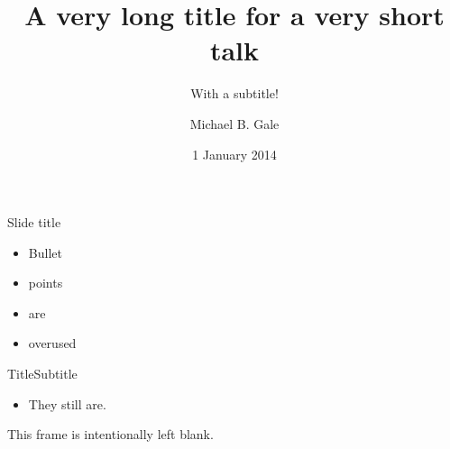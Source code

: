 \documentclass[aspectratio=1610]{beamer}
\title{A very long title for a very short talk}
\subtitle{With a subtitle!}
\date{1 January 2014}
\author{Michael B. Gale}
\institute{Computer Laboratory, University of Cambridge}
\begin{document}
\begin{frame}
\maketitle
\end{frame}

\begin{frame}{Slide title}
\begin{itemize}
\item Bullet
\item points
\item are
\item overused
\end{itemize}
\end{frame}

\begin{frame}{Title}{Subtitle}
\begin{itemize}
\item They still are.
\end{itemize}
\end{frame}

\begin{frame}
\begin{center}
This frame is intentionally left blank.
\end{center}
\end{frame}
\end{document}
